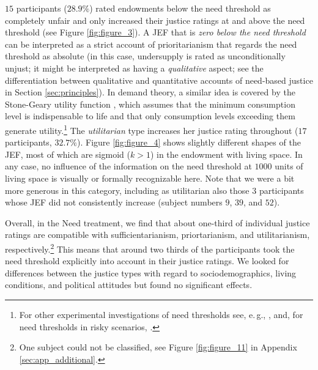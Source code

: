 \documentclass[12pt]{scrartcl}
\begin{document}
$15$ participants ($28.9\%$) rated endowments below the need threshold as completely unfair and only increased their justice ratings at and above the need threshold (see Figure \ref{fig:figure_3}).
A JEF that is \textit{zero below the need threshold} can be interpreted as a strict account of prioritarianism that regards the need threshold as absolute (in this case, undersupply is rated as unconditionally unjust; it might be interpreted as having a \textit{qualitative} aspect; see the differentiation between qualitative and quantitative accounts of need-based justice in Section \ref{sec:principles}).
In demand theory, a similar idea is covered by the Stone-Geary utility function \citep{geary_note_1950,stone_linear_1954}, which assumes that the minimum consumption level is indispensable to life and that only consumption levels exceeding them generate utility.\footnote{For other experimental investigations of need thresholds see, e.\,g., \citet{bauer_winter_2023,bauer_equal_2024}, and, for need thresholds in risky scenarios, \citet{diederich_need_2020}.}
The \textit{utilitarian} type increases her justice rating throughout ($17$ participants, $32.7\%$).
Figure \ref{fig:figure_4} shows slightly different shapes of the JEF, most of which are sigmoid ($k>1$) in the endowment with living space.
In any case, no influence of the information on the need threshold at $1000$ units of living space is visually or formally recognizable here.
Note that we were a bit more generous in this category, including as utilitarian also those $3$ participants whose JEF did not consistently increase (subject numbers $9$, $39$, and $52$).

Overall, in the Need treatment, we find that about one-third of individual justice ratings are compatible with sufficientarianism, priortarianism, and utilitarianism, respectively.\footnote{One subject could not be classified, see Figure \ref{fig:figure_11} in Appendix \ref{sec:app_additional}.}
This means that around two thirds of the participants took the need threshold explicitly into account in their justice ratings.
We looked for differences between the justice types with regard to sociodemographics, living conditions, and political attitudes but found no significant effects.
\end{document}
